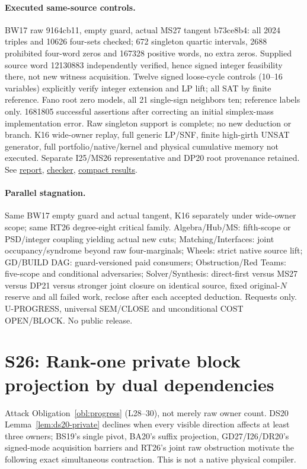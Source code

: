 \documentclass[11pt]{article}
\begin{document}
\paragraph{Executed same-source controls.}
BW17 raw 9164cb11, empty guard, actual MS27 tangent b73ce8b4: all 2024 triples and 10626 four-sets checked; 672 singleton quartic intervals, 2688 prohibited four-word zeros and 167328 positive words, no extra zeros. Supplied source word 12130883 independently verified, hence signed integer feasibility there, not new witness acquisition. Twelve signed loose-cycle controls (10--16 variables) explicitly verify integer extension and LP lift; all SAT by finite reference. Fano root zero models, all 21 single-sign neighbors ten; reference labels only. 1681805 successful assertions after correcting an initial simplex-mass implementation error. Raw singleton support is complete; no new deduction or branch. K16 wide-owner replay, full generic LP/SNF, finite high-girth UNSAT generator, full portfolio/native/kernel and physical cumulative memory not executed. Separate I25/MS26 representative and DP20 root provenance retained. See \href{https://github.com/j15marti/pnp/commit/c246df920dfa3a3ce71bbd368cecf638019227ce}{report}, \href{https://github.com/j15marti/pnp/commit/861de48d107b57f693ecc17e719e2212eb865576}{checker}, \href{https://github.com/j15marti/pnp/commit/e428dfec7ed4fa09cee6592ddb0ffafe01484dfa}{compact results}.
\paragraph{Parallel stagnation.}
Same BW17 empty guard and actual tangent, K16 separately under wide-owner scope; same RT26 degree-eight critical family. Algebra/Hub/MS: fifth-scope or PSD/integer coupling yielding actual new cuts; Matching/Interfaces: joint occupancy/syndrome beyond raw four-marginals; Wheels: strict native source lift; GD/BUILD DAG: guard-versioned paid consumers; Obstruction/Red Teams: five-scope and conditional adversaries; Solver/Synthesis: direct-first versus MS27 versus DP21 versus stronger joint closure on identical source, fixed original-$N$ reserve and all failed work, reclose after each accepted deduction. Requests only. U-PROGRESS, universal SEM/CLOSE and unconditional COST OPEN/BLOCK. No public release.


\section{S26: Rank-one private block projection by dual dependencies}\label{sec:s26}
Attack Obligation~\ref{obl:progress} (L28--30), not merely raw owner count. DS20 Lemma~\ref{lem:ds20-private} declines when every visible direction affects at least three owners; BS19's single pivot, BA20's suffix projection, GD27/I26/DR20's signed-mode acquisition barriers and RT26's joint raw obstruction motivate the following exact simultaneous contraction. This is not a native physical compiler.
\end{document}
